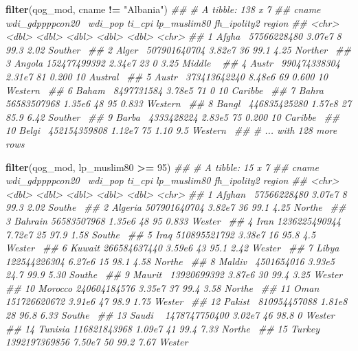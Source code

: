 \documentclass[]{book}
\newenvironment{Shaded}{\begin{snugshade}}{\end{snugshade}}
\newcommand{\CommentTok}[1]{\textcolor[rgb]{0.56,0.35,0.01}{\textit{#1}}}
\newcommand{\DecValTok}[1]{\textcolor[rgb]{0.00,0.00,0.81}{#1}}
\newcommand{\KeywordTok}[1]{\textcolor[rgb]{0.13,0.29,0.53}{\textbf{#1}}}
\newcommand{\NormalTok}[1]{#1}
\newcommand{\OperatorTok}[1]{\textcolor[rgb]{0.81,0.36,0.00}{\textbf{#1}}}
\newcommand{\StringTok}[1]{\textcolor[rgb]{0.31,0.60,0.02}{#1}}
\begin{document}
\begin{Shaded}
\begin{Highlighting}[]
\KeywordTok{filter}\NormalTok{(qog_mod, cname }\OperatorTok{!=}\StringTok{ "Albania"}\NormalTok{)}
\CommentTok{## # A tibble: 138 x 7}
\CommentTok{##    cname  wdi_gdppppcon20~ wdi_pop ti_cpi lp_muslim80 fh_ipolity2 region  }
\CommentTok{##    <chr>             <dbl>   <dbl>  <dbl>       <dbl>       <dbl> <chr>   }
\CommentTok{##  1 Afgha~      57566228480  3.07e7      8      99.3         2.02  Souther~}
\CommentTok{##  2 Alger~     507901640704  3.82e7     36      99.1         4.25  Norther~}
\CommentTok{##  3 Angola     152477499392  2.34e7     23       0           3.25  Middle ~}
\CommentTok{##  4 Austr~     990474338304  2.31e7     81       0.200      10     Austral~}
\CommentTok{##  5 Austr~     373413642240  8.48e6     69       0.600      10     Western~}
\CommentTok{##  6 Baham~       8497731584  3.78e5     71       0          10     Caribbe~}
\CommentTok{##  7 Bahra~      56583507968  1.35e6     48      95           0.833 Western~}
\CommentTok{##  8 Bangl~     446835425280  1.57e8     27      85.9         6.42  Souther~}
\CommentTok{##  9 Barba~       4333428224  2.83e5     75       0.200      10     Caribbe~}
\CommentTok{## 10 Belgi~     452154359808  1.12e7     75       1.10        9.5   Western~}
\CommentTok{## # ... with 128 more rows}

\KeywordTok{filter}\NormalTok{(qog_mod, lp_muslim80 }\OperatorTok{>=}\StringTok{ }\DecValTok{95}\NormalTok{)}
\CommentTok{## # A tibble: 15 x 7}
\CommentTok{##    cname   wdi_gdppppcon20~ wdi_pop ti_cpi lp_muslim80 fh_ipolity2 region }
\CommentTok{##    <chr>              <dbl>   <dbl>  <dbl>       <dbl>       <dbl> <chr>  }
\CommentTok{##  1 Afghan~      57566228480  3.07e7    8          99.3       2.02  Southe~}
\CommentTok{##  2 Algeria     507901640704  3.82e7   36          99.1       4.25  Northe~}
\CommentTok{##  3 Bahrain      56583507968  1.35e6   48          95         0.833 Wester~}
\CommentTok{##  4 Iran       1236225490944  7.72e7   25          97.9       1.58  Southe~}
\CommentTok{##  5 Iraq        510895521792  3.38e7   16          95.8       4.5   Wester~}
\CommentTok{##  6 Kuwait      266584637440  3.59e6   43          95.1       2.42  Wester~}
\CommentTok{##  7 Libya       122544226304  6.27e6   15          98.1       4.58  Northe~}
\CommentTok{##  8 Maldiv~       4501654016  3.93e5   24.7        99.9       5.30  Southe~}
\CommentTok{##  9 Maurit~      13920699392  3.87e6   30          99.4       3.25  Wester~}
\CommentTok{## 10 Morocco     240604184576  3.35e7   37          99.4       3.58  Northe~}
\CommentTok{## 11 Oman        151726620672  3.91e6   47          98.9       1.75  Wester~}
\CommentTok{## 12 Pakist~     810954457088  1.81e8   28          96.8       6.33  Southe~}
\CommentTok{## 13 Saudi ~    1478747750400  3.02e7   46          98.8       0     Wester~}
\CommentTok{## 14 Tunisia     116821843968  1.09e7   41          99.4       7.33  Northe~}
\CommentTok{## 15 Turkey     1392197369856  7.50e7   50          99.2       7.67  Wester~}


\end{Highlighting}
\end{Shaded}
\end{document}
